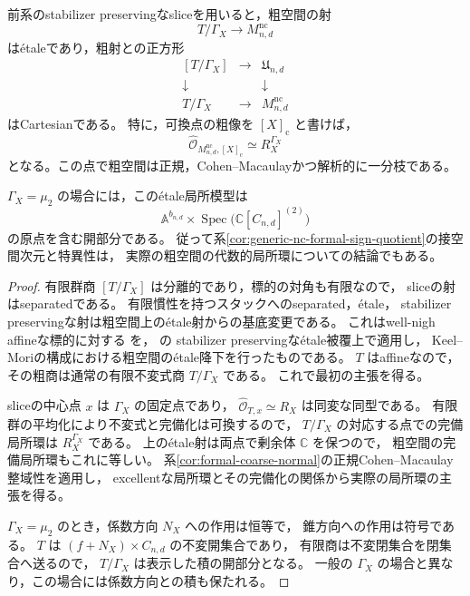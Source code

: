 \begin{corollary}[粗空間の代数的局所模型]
\label{cor:algebraic-coarse-local-model}
前系のstabilizer preservingなsliceを用いると，粗空間の射
\[
 T/\Gamma_X\longrightarrow M^{\mathrm{nc}}_{n,d}
\]
は\'{e}taleであり，粗射との正方形
\[
\begin{array}{ccc}
[T/\Gamma_X]&\longrightarrow&\mathfrak U_{n,d}\\
\downarrow&&\downarrow\\
T/\Gamma_X&\longrightarrow&M^{\mathrm{nc}}_{n,d}
\end{array}
\]
はCartesianである。
特に，可換点の粗像を $[X]_{\mathrm c}$ と書けば，
\[
 \widehat{\mathcal O}_{M^{\mathrm{nc}}_{n,d},[X]_{\mathrm c}}
 \simeq R_X^{\Gamma_X}
\]
となる。この点で粗空間は正規，Cohen--Macaulayかつ解析的に一分枝である。

$\Gamma_X=\mu_2$ の場合には，この\'{e}tale局所模型は
\[
 \mathbb A^{b_{n,d}}\times
 \operatorname{Spec}\bigl(\mathbb C[C_{n,d}]^{(2)}\bigr)
\]
の原点を含む開部分である。
従って系\ref{cor:generic-nc-formal-sign-quotient}の接空間次元と特異性は，
実際の粗空間の代数的局所環についての結論でもある。
\end{corollary}
\begin{proof}
有限群商 $[T/\Gamma_X]$ は分離的であり，標的の対角も有限なので，
sliceの射はseparatedである。
有限慣性を持つスタックへのseparated，\'{e}tale，
stabilizer preservingな射は粗空間上の\'{e}tale射からの基底変更である。
これはwell-nigh affineな標的に対する
\cite[Lemma 106.13.7, Tag 0DUS]{StacksProject}を，
\cite[Lemma 106.13.8, Tag 0DUE]{StacksProject}の
stabilizer preservingな\'{e}tale被覆上で適用し，
Keel--Moriの構成における粗空間の\'{e}tale降下を行ったものである。
$T$ はaffineなので，その粗商は通常の有限不変式商 $T/\Gamma_X$ である。
これで最初の主張を得る。

sliceの中心点 $x$ は $\Gamma_X$ の固定点であり，
$\widehat{\mathcal O}_{T,x}\simeq R_X$ は同変な同型である。
有限群の平均化により不変式と完備化は可換するので，
$T/\Gamma_X$ の対応する点での完備局所環は $R_X^{\Gamma_X}$ である。
上の\'{e}tale射は両点で剰余体 $\mathbb C$ を保つので，
粗空間の完備局所環もこれに等しい。
系\ref{cor:formal-coarse-normal}の正規Cohen--Macaulay整域性を適用し，
excellentな局所環とその完備化の関係から実際の局所環の主張を得る。

$\Gamma_X=\mu_2$ のとき，係数方向 $N_X$ への作用は恒等で，
錐方向への作用は符号である。
$T$ は $(f+N_X)\times C_{n,d}$ の不変開集合であり，
有限商は不変閉集合を閉集合へ送るので，
$T/\Gamma_X$ は表示した積の開部分となる。
一般の $\Gamma_X$ の場合と異なり，この場合には係数方向との積も保たれる。
\end{proof}
